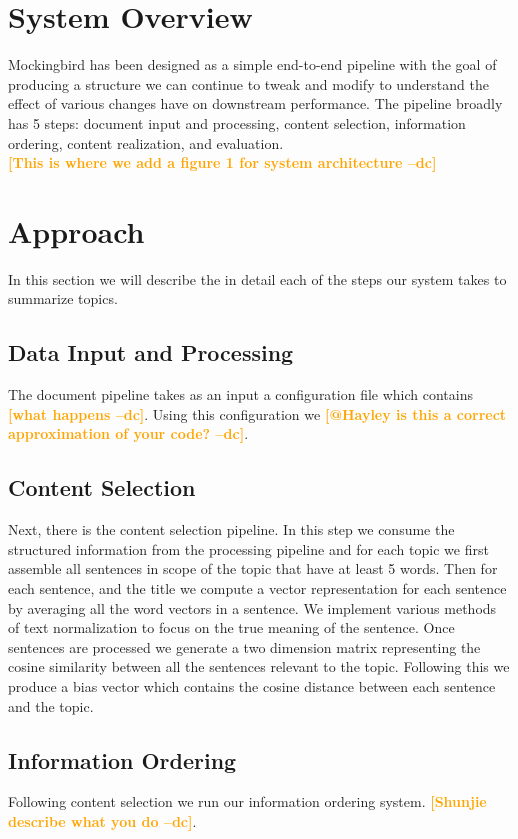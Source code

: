 \documentclass[11pt,a4paper]{article}
\newcommand{\spacemanidol}[1]{\textcolor{orange}{\bf \small [#1 --dc]}}
\begin{document}
\section{System Overview}
Mockingbird has been designed as a simple end-to-end pipeline with the goal of producing a structure we can continue to tweak and modify to understand the effect of various changes have on downstream performance. The pipeline broadly has 5 steps: document input and processing, content selection, information ordering, content realization, and evaluation.\\
\spacemanidol{This is where we add a figure 1 for system architecture}
\section{Approach}
In this section we will describe the in detail each of the steps our system takes to summarize topics.
\subsection{Data Input and Processing}
The document pipeline takes as an input a configuration file which contains \spacemanidol{what happens}. Using this configuration we  \spacemanidol{@Hayley is this a correct approximation of your code?}.\\
\subsection{Content Selection}
Next, there is the content selection pipeline. In this step we consume the structured information from the processing pipeline and for each topic we first assemble all sentences in scope of the topic that have at least 5 words. Then for each sentence, and the title we compute a vector representation for each sentence by averaging all the word vectors in a sentence. We implement various methods of text normalization to focus on the true meaning of the sentence. Once sentences are processed we generate a two dimension matrix representing the cosine similarity between all the sentences relevant to the topic. Following this we produce a bias vector which contains the cosine distance between each sentence and the topic. 
\subsection{Information Ordering}
Following content selection we run our information ordering system. \spacemanidol{Shunjie describe what you do}.\\
\end{document}
